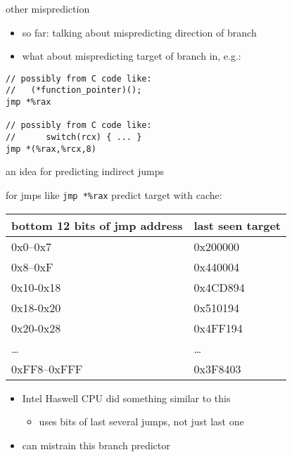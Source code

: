\begin{frame}[fragile]{other misprediction}
\begin{itemize}
\item so far: talking about mispredicting direction of branch
\item what about mispredicting target of branch in, e.g.:
\end{itemize}
\begin{lstlisting}
// possibly from C code like:
//   (*function_pointer)();
jmp *%rax           

// possibly from C code like:
//      switch(rcx) { ... }
jmp *(%rax,%rcx,8)  
\end{lstlisting}
\end{frame}

\begin{frame}[fragile]{an idea for predicting indirect jumps}

for jmps like \lstinline|jmp *%rax| predict target with cache: \\
\begin{tabular}{ll}
bottom 12 bits of jmp address & last seen target \\ \hline
0x0--0x7 & 0x200000 \\
0x8--0xF & 0x440004 \\
0x10-0x18 & 0x4CD894 \\
0x18-0x20 & 0x510194 \\
0x20-0x28 & 0x4FF194 \\
\ldots & \ldots \\
0xFF8--0xFFF & 0x3F8403 \\
\end{tabular}
\begin{itemize}
\item Intel Haswell CPU did something similar to this
    \begin{itemize}
    \item uses bits of last several jumps, not just last one
    \end{itemize}
\item can mistrain this branch predictor
\end{itemize}
\end{frame}

